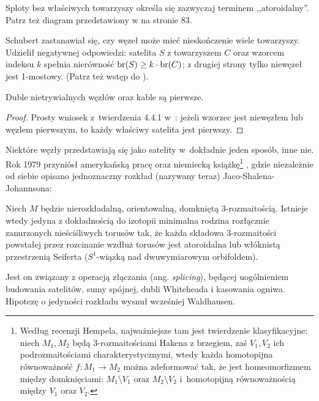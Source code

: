 Sploty bez właściwych towarzyszy określa się zazwyczaj terminem ,,atoroidalny''.
%
Patrz też diagram przedstawiony w \cite{cromwell04} na stronie 83.

Schubert \cite{schubert54} zastanawiał się, czy węzeł może mieć nieskończenie wiele towarzyszy.
Udzielił negatywnej odpowiedzi: satelita $S$ z towarzyszem $C$ oraz wzorcem indeksu $k$ spełnia nierówność $\operatorname{br}(S) \ge k \cdot \operatorname{br}(C)$; z drugiej strony tylko niewęzeł jest 1-mostowy.
(Patrz też wstęp do \cite{schultens03}).

\begin{proposition}
    Duble nietrywialnych węzłów oraz kable są pierwsze.
\end{proposition}

\begin{proof}
    Prosty wniosek z~twierdzenia 4.4.1 w~\cite[s. 84]{cromwell04}: jeżeli wzorzec jest niewęzłem lub węzłem pierwszym, to każdy właściwy satelita jest pierwszy.
\end{proof}

Niektóre węzły przedstawiają się jako satelity w~dokładnie jeden sposób, inne nie.
Rok 1979 przyniósł amerykańską pracę \cite{jaco79} oraz niemiecką książkę\footnote{Według recenzji Hempela, najważniejsze tam jest twierdzenie klasyfikacyjne: niech $M_1, M_2$ będą 3-rozmaitościami Hakena  z brzegiem, zaś $V_1, V_2$ ich podrozmaitościami charakterystycznymi, wtedy każda homotopijna równoważność $f \colon M_1 \to M_2$ można zdeformować tak, że jest homeomorfizmem między domknięciami: $M_1 \setminus V_1$ oraz $M_2 \setminus V_2$ i~homotopijną równoważnością między $V_1$ oraz $V_2$.} \cite{johannson79}, gdzie niezależnie od siebie opisano jednoznaczny rozkład (nazywany teraz) Jaco-Shalena-Johannsona:
%
%
%

\begin{proposition}
    Niech $M$ będzie nierozkładalną, orientowalną, domkniętą 3-rozmaitością.
    Istnieje wtedy jedyna z dokładnością do izotopii minimalna rodzina rozłącznie zanurzonych nieściśliwych torusów tak, że każda składowa 3-rozmaitości powstałej przez rozcinanie wzdłuż torusów jest atoroidalna lub włóknistą przestrzenią Seiferta ($S^1$-wiązką nad dwuwymiarowym orbifoldem).
%
%
%
%
\end{proposition}

Jest on związany z operacją złączania (ang. \emph{splicing}), będącej uogólnieniem budowania satelitów, sumy spójnej, dubli Whiteheada i kasowania ogniwa.
%
Hipotezę o jedyności rozkładu wysnuł wcześniej Waldhausen.
%


